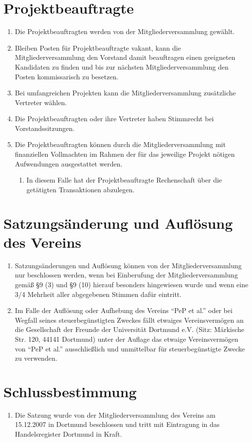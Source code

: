 \documentclass[
  fontsize=12pt,
  paper=a4,
  DIV14,
  parskip,
]{scrartcl}
\begin{document}
\section{Projektbeauftragte}

\begin{enumerate}
	\item Die Projektbeauftragten werden von der Mitgliederversammlung gewählt.
	\item Bleiben Posten für Projektbeauftragte vakant, kann die
		Mitgliederversammlung den Vorstand damit beauftragen einen geeigneten
		Kandidaten zu finden und bis zur nächsten Mitgliederversammlung den Posten
		kommissarisch zu besetzen.
 	\item Bei umfangreichen Projekten kann die Mitgliederversammlung zusätzliche
		Vertreter wählen.
	\item Die Projektbeauftragten oder ihre Vertreter haben Stimmrecht bei
		Vorstandssitzungen.
	\item Die Projektbeauftragten können durch die Mitgliederversammlung mit
		finanziellen Vollmachten im Rahmen der für das jeweilige Projekt nötigen
		Aufwendungen ausgestattet werden.
		\begin{enumerate}
			\item In diesem Falle hat der Projektbeauftragte Rechenschaft über die
				getätigten Transaktionen abzulegen.
		\end{enumerate}
\end{enumerate}

\section{Satzungsänderung und Auflösung des Vereins}

\begin{enumerate}
	\item Satzungsänderungen und Auflösung können von der Mitgliederversammlung
		nur beschlossen werden, wenn bei Einberufung der Mitgliederversammlung
		gemäß §9 (3) und §9 (10) hierauf besonders hingewiesen wurde und wenn eine
		3/4 Mehrheit aller abgegebenen Stimmen dafür eintritt.
	\item Im Falle der Auflösung oder Aufhebung des Vereins \enquote{PeP et
		al.} oder bei Wegfall seines steuerbegünstigten Zweckes fällt
		etwaiges Vereinsvermögen an die Gesellschaft der Freunde der Universität
		Dortmund e.V. (Sitz: Märkische Str. 120, 44141 Dortmund) unter der Auflage
		das etwaige Vereinsvermögen von \enquote{PeP et al.} ausschließlich und
		unmittelbar für steuerbegünstigte Zwecke zu verwenden.
\end{enumerate}

\section{Schlussbestimmung}

\begin{enumerate}
	\item Die Satzung wurde von der Mitgliederversammlung des Vereins am
		15.12.2007 in Dortmund beschlossen und tritt mit Eintragung in das
		Handelsregister Dortmund in Kraft.
\end{enumerate}
\end{document}
